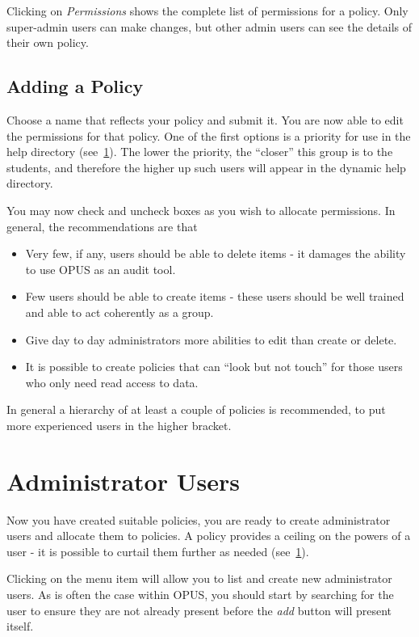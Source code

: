 \documentclass[12 pt]{book}
\begin{document}
Clicking on \emph{Permissions} shows the complete list of permissions for a
policy. Only super-admin users can make changes, but other admin users can
see the details of their own policy.

\subsection{Adding a Policy}

Choose a name that reflects your policy and submit it. You are now able to
edit the permissions for that policy. One of the first options is a priority
for use in the help directory (see~\ref{}). The lower the priority, the 
``closer'' this group is to the students, and therefore the
higher up such users will appear in the dynamic help directory.

You may now check and uncheck boxes as you wish to allocate permissions. 
In general, the recommendations are that
\begin{itemize}
  \item Very few, if any, users should be able to delete items - it damages
    the ability to use OPUS as an audit tool.
  \item Few users should be able to create items - these users should be well
    trained and able to act coherently as a group.
  \item Give day to day administrators more abilities to edit than create or delete.
  \item It is possible to create policies that can ``look but not touch'' for those
    users who only need read access to data.
\end{itemize}

In general a hierarchy of at least a couple of policies is recommended, to put
more experienced users in the higher bracket.

\section{Administrator Users}

Now you have created suitable policies, you are ready to create administrator
users and allocate them to policies. A policy provides a ceiling on the powers
of a user - it is possible to curtail them further as needed (see~\ref{}).

Clicking on the  menu item will 
allow you to list and create new administrator users. As is often the case 
within OPUS, you should start by searching for the user to ensure they are not
already present before the \emph{add} button will present itself.
\end{document}
